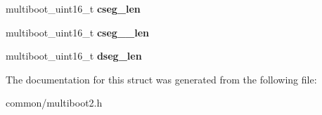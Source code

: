 \begin{DoxyCompactItemize}
\item 
multiboot\+\_\+uint16\+\_\+t {\bfseries cseg\+\_\+len}\hypertarget{structmultiboot__tag__apm_ab6707ad19a33da4a07b1e3a747c3da16}{}\label{structmultiboot__tag__apm_ab6707ad19a33da4a07b1e3a747c3da16}

\item 
multiboot\+\_\+uint16\+\_\+t {\bfseries cseg\+\_\+\_\+len}\hypertarget{structmultiboot__tag__apm_ac9ce4f6a6baa2cd0fea47ab1b4802e7b}{}\label{structmultiboot__tag__apm_ac9ce4f6a6baa2cd0fea47ab1b4802e7b}

\item 
multiboot\+\_\+uint16\+\_\+t {\bfseries dseg\+\_\+len}\hypertarget{structmultiboot__tag__apm_a8d82e38b5d8b110027acc7c21b4a853d}{}\label{structmultiboot__tag__apm_a8d82e38b5d8b110027acc7c21b4a853d}

\end{DoxyCompactItemize}


The documentation for this struct was generated from the following file\+:\begin{DoxyCompactItemize}
\item 
common/multiboot2.\+h\end{DoxyCompactItemize}
